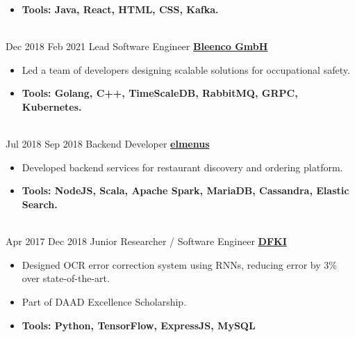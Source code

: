 \documentclass[letterpaper]{twentysecondcv} %
\begin{document}
\begin{twenty}
{\begin{itemize}
                    \item \textbf{Tools: Java, React, HTML, CSS, Kafka.}
                \end{itemize}
            }
            {\\}
        \twentyitem
      		{Dec 2018}
    		{Feb 2021}
            {Lead Software Engineer}
            {\large\textbf{\href{https://bleenco.com/}{Bleenco GmbH}}}
            {
                \begin{itemize}
                    \item Led a team of developers designing scalable solutions for occupational safety.
                    \item \textbf{Tools: Golang, C++, TimeScaleDB, RabbitMQ, GRPC, Kubernetes.}
                \end{itemize}
            }
            {\\}
        \twentyitem
       		{Jul 2018}
    		{Sep 2018}
            {Backend Developer}
            {\large\textbf{\href{https://elmenus.com/}{elmenus}}}
            {
                \begin{itemize}
                    \item Developed backend services for restaurant discovery and ordering platform.
                    \item \textbf{Tools: NodeJS, Scala, Apache Spark, MariaDB, Cassandra, Elastic Search.}
                \end{itemize}
            }
            {\\}
        \twentyitem
       		{Apr 2017}
    		{Dec 2018}
            {Junior Researcher / Software Engineer}
            {\large\textbf{\href{http://www.dfki.de/}{DFKI}}}
            {
                \begin{itemize}
                    \item Designed OCR error correction system using RNNs, reducing error by 3\% over state-of-the-art.
                    \item Part of DAAD Excellence Scholarship.
                    \item \textbf{Tools: Python, TensorFlow, ExpressJS, MySQL}
                \end{itemize}
            }
            {\\}
    \end{twenty}
\end{document}
